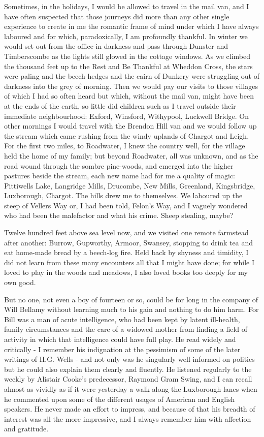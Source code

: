 Sometimes, in the holidays, I would be allowed to travel in the mail van, and I have often suspected that those journeys did more than any other single experience to create in me the romantic frame of mind under which I have always laboured and for which, paradoxically, I am profoundly thankful. In winter we would set out from the office in darkness and pass through Dunster and Timberscombe as the lights still glowed in the cottage windows. As we climbed the thousand feet up to the Rest and Be Thankful at Wheddon Cross, the stars were paling and the beech hedges and the cairn of Dunkery were struggling out of darkness into the grey of morning. Then we would pay our visits to those villages of which I had so often heard but which, without the mail van, might have been at the ends of the earth, so little did children such as I travel outside their immediate neighbourhood: Exford, Winsford, Withypool, Luckwell Bridge. On other mornings I would travel with the Brendon Hill van and we would follow up the stream which came rushing from the windy uplands of Chargot and Leigh. For the first two miles, to Roadwater, I knew the country well, for the village held the home of my family; but beyond Roadwater, all was unknown, and as the road wound through the sombre pine-woods, and emerged into the higher pastures beside the stream, each new name had for me a quality of magic: Pittiwells Lake, Langridge Mills, Drucombe, New Mills, Greenland, Kingsbridge, Luxborough, Chargot. The hills drew me to themselves. We laboured up the steep of Vellers Way or, I had been told, Felon's Way, and I vaguely wondered who had been the malefactor and what his crime. Sheep stealing, maybe?

Twelve hundred feet above sea level now, and we visited one remote farmstead after another: Burrow, Gupworthy, Armoor, Swansey, stopping to drink tea and eat home-made bread by a beech-log fire. Held back by shyness and timidity, I did not learn from these many encounters all that I might have done; for while I loved to play in the woods and meadows, I also loved books too deeply for my own good.

But no one, not even a boy of fourteen or so, could be for long in the company of Will Bellamy without learning much to his gain and nothing to do him harm. For Bill was a man of acute intelligence, who had been kept by latent ill-health, family circumstances and the care of a widowed mother from finding a field of activity in which that intelligence could have full play. He read widely and critically - I remember his indignation at the  pessimism of some of the later writings of H.G. Wells - and not only was he singularly well-informed on politics but he could also explain them clearly and fluently. He listened regularly to the weekly  by Alistair Cooke's predecessor, Raymond Gram Swing, and I can recall almost as vividly as if it were yesterday a walk along the Luxborough lanes when he commented upon some of the different usages of American and English speakers. He never made an effort to impress, and because of that his breadth of interest was all the more impressive, and I always remember him with affection and gratitude.

